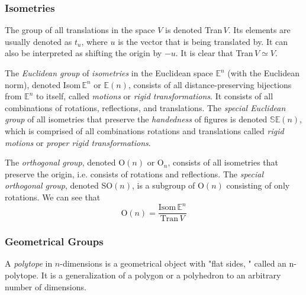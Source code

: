 \documentclass{article}
\begin{document}
    \subsubsection{Isometries}

      \begin{definition}
        The group of all translations in the space $V$ is denoted Tran$\,V$. Its elements are usually denoted as $t_{u}$, where $u$ is the vector that is being translated by. It can also be interpreted as shifting the origin by $-u$. It is clear that Tran$\,V \simeq V$. 
      \end{definition}

      \begin{definition}
        The \textit{Euclidean group} of \textit{isometries} in the Euclidean space $\mathbb{E}^{n}$ (with the Euclidean norm), denoted Isom$\, \mathbb{E}^{n}$ or $\mathbb{E}(n)$, consists of all distance-preserving bijections from $\mathbb{E}^{n}$ to itself, called \textit{motions} or \textit{rigid transformations}. It consists of all combinations of rotations, reflections, and translations. The \textit{special Euclidean group} of all isometries that preserve the \textit{handedness} of figures is denoted $\mathbb{SE}(n)$, which is comprised of all combinations rotations and translations called \textit{rigid motions} or \textit{proper rigid transformations}.
      \end{definition}

      \begin{definition}
        The \textit{orthogonal group}, denoted O$(n)$ or O$_{n}$, consists of all isometries that preserve the origin, i.e. consists of rotations and reflections. The \textit{special orthogonal group}, denoted SO$(n)$, is a subgroup of O$(n)$ consisting of only rotations. We can see that 
        \begin{equation}
          \text{O}(n)=\frac{\text{Isom}\, \mathbb{E}^{n}}{\text{Tran}\,V}
        \end{equation}
      \end{definition}

    \subsubsection{Geometrical Groups}

      \begin{definition}
        A \textit{polytope} in $n$-dimensions is a geometrical object with "flat sides, " called an n-polytope. It is a generalization of a polygon or a polyhedron to an arbitrary number of dimensions. 
      \end{definition}
\end{document}
